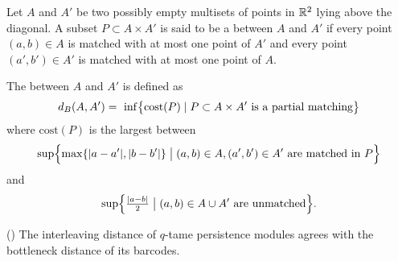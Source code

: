 \subsubsection{}


Let $A$ and $A'$ be two possibly empty multisets of points in $\R^2$ lying above the diagonal.
A subset $P \subset A \times A'$ is said to be a  between $A$ and $A'$ if every point $(a, b) \in A$ is matched with at most one point of $A'$ and every point $(a', b') \in A'$ is matched with at most one point of $A$.

The  between $A$ and $A'$ is defined as
\[
d_B(A, A') = \
\inf \set[\big]{\mathrm{cost}(P) \mid P \subset A \times A' \text{ is a partial matching}}
\]
where $\mathrm{cost}(P)$ is the largest between
\[
\sup \set[\Big]{\max\set{|a - a'|, |b - b'|} \bigm| (a, b) \in A, (a', b') \in A' \text{ are matched in }P}
\]
and
\[
\sup \set[\Big]{\tfrac{ |a - b|}{2}  \bigm| (a, b) \in A \cup A' \text{ are unmatched}}.
\]



\medskip\theorem(\cite[Thm.~5.14]{chazal2016stability})
The interleaving distance of $q$-tame persistence modules agrees with the bottleneck distance of its barcodes.



